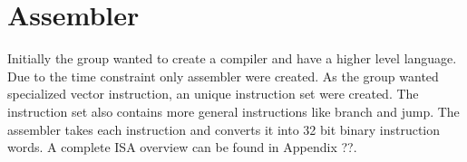 \section{Assembler}
Initially the group wanted to create a compiler and have a higher level language.
Due to the time constraint only assembler were created.
As the group wanted specialized vector instruction, an unique instruction set were created.
The instruction set also contains more general instructions like branch and jump.
The assembler takes each instruction and converts it into 32 bit binary instruction words.
A complete ISA overview can be found in Appendix ??.
